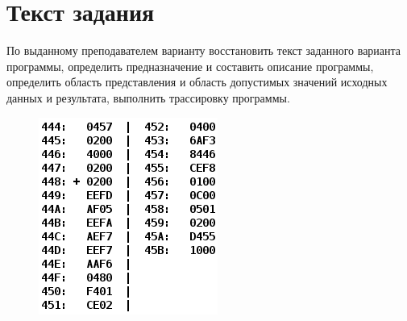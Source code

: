 \section{Текст задания}
По выданному преподавателем варианту восстановить текст заданного варианта программы,
определить предназначение и составить описание программы, определить область представления
и область допустимых значений исходных данных и результата, выполнить трассировку программы.
\begin{figure}[ht]
    \centering
    \includegraphics{img/task.png}
\end{figure}